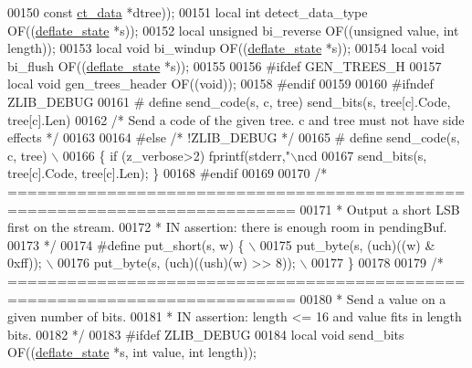 \begin{DoxyCode}
00150                               \textcolor{keyword}{const} \hyperlink{structct__data__s}{ct\_data} *dtree));
00151 local \textcolor{keywordtype}{int}  detect\_data\_type OF((\hyperlink{structinternal__state}{deflate\_state} *s));
00152 local \textcolor{keywordtype}{unsigned} bi\_reverse OF((\textcolor{keywordtype}{unsigned} value, \textcolor{keywordtype}{int} length));
00153 local \textcolor{keywordtype}{void} bi\_windup      OF((\hyperlink{structinternal__state}{deflate\_state} *s));
00154 local \textcolor{keywordtype}{void} bi\_flush       OF((\hyperlink{structinternal__state}{deflate\_state} *s));
00155 
00156 \textcolor{preprocessor}{#ifdef GEN\_TREES\_H}
00157 local \textcolor{keywordtype}{void} gen\_trees\_header OF((\textcolor{keywordtype}{void}));
00158 \textcolor{preprocessor}{#endif}
00159 
00160 \textcolor{preprocessor}{#ifndef ZLIB\_DEBUG}
00161 \textcolor{preprocessor}{#  define send\_code(s, c, tree) send\_bits(s, tree[c].Code, tree[c].Len)}
00162    \textcolor{comment}{/* Send a code of the given tree. c and tree must not have side effects */}
00163 
00164 \textcolor{preprocessor}{#else }\textcolor{comment}{/* !ZLIB\_DEBUG */}\textcolor{preprocessor}{}
00165 \textcolor{preprocessor}{#  define send\_code(s, c, tree) \(\backslash\)}
00166 \textcolor{preprocessor}{     \{ if (z\_verbose>2) fprintf(stderr,"\(\backslash\)ncd %
00167 \textcolor{preprocessor}{       send\_bits(s, tree[c].Code, tree[c].Len); \}}
00168 \textcolor{preprocessor}{#endif}
00169 
00170 \textcolor{comment}{/* ===========================================================================}
00171 \textcolor{comment}{ * Output a short LSB first on the stream.}
00172 \textcolor{comment}{ * IN assertion: there is enough room in pendingBuf.}
00173 \textcolor{comment}{ */}
00174 \textcolor{preprocessor}{#define put\_short(s, w) \{ \(\backslash\)}
00175 \textcolor{preprocessor}{    put\_byte(s, (uch)((w) & 0xff)); \(\backslash\)}
00176 \textcolor{preprocessor}{    put\_byte(s, (uch)((ush)(w) >> 8)); \(\backslash\)}
00177 \textcolor{preprocessor}{\}}
00178 
00179 \textcolor{comment}{/* ===========================================================================}
00180 \textcolor{comment}{ * Send a value on a given number of bits.}
00181 \textcolor{comment}{ * IN assertion: length <= 16 and value fits in length bits.}
00182 \textcolor{comment}{ */}
00183 \textcolor{preprocessor}{#ifdef ZLIB\_DEBUG}
00184 local \textcolor{keywordtype}{void} send\_bits      OF((\hyperlink{structinternal__state}{deflate\_state} *s, \textcolor{keywordtype}{int} value, \textcolor{keywordtype}{int} length));
}
\end{DoxyCode}
